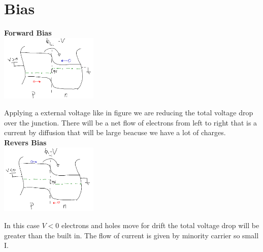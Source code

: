 \section{Bias}


\centering
{}
\raggedright


\vspace{3mm}
{\bf Forward Bias}\\

\centering
\includegraphics[width=0.35\textwidth]{pn7.png}\\
\raggedright

Applying a external voltage like in figure we are reducing the total voltage drop over the junction. There will be a net flow of electrons from left to right that is a current by diffusion that will be large beacuse we have a lot of charges.\\
{\bf Revers Bias}\\

\centering
\includegraphics[width=0.35\textwidth]{pn8.png}\\
\raggedright

In this case $V<0$ electrons and holes move for drift the total voltage drop will be greater than the built in. The flow of current is given by minority carrier so small I.\\


